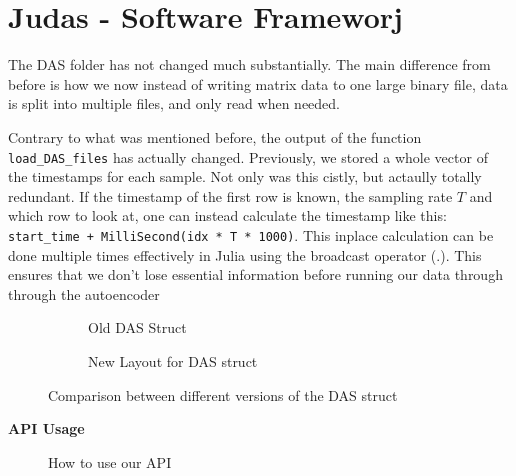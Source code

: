 \section{Judas - Software Frameworj}

The DAS folder has not changed much substantially. The main difference from before is how we now instead of writing matrix data to one large binary file, data is split into multiple files, and only read when needed.

Contrary to what was mentioned before, the output of the function \texttt{load\_DAS\_files} has actually changed. Previously, we stored a whole vector of the timestamps for each sample. Not only was this cistly, but actaully totally redundant. If the timestamp of the first row is known, the sampling rate $T$ and which row to look at, one can instead calculate the timestamp like this: 
\lstinline|start_time + MilliSecond(idx * T * 1000)|. This inplace calculation can be done multiple times effectively in Julia using the broadcast operator (.). This ensures that we don't lose essential information before running our data through through the autoencoder

\begin{figure}[h]
\centering
\begin{subfigure}{.5\textwidth}
  \centering
  
  \caption{Old DAS Struct}
  \label{fig:olddasstc}
\end{subfigure}%
\begin{subfigure}{.5\textwidth}
  \centering
  
  \caption{New Layout for DAS struct}
  \label{fig:newdasstc}
\end{subfigure}
\caption{Comparison between different versions of the DAS struct}
\label{fig:dasstccmp}
\end{figure}




\textbf{API Usage}

\begin{figure}[h]
    \centering
    
    \caption{How to use our API}
    \label{fig:apiusage}
\end{figure}

